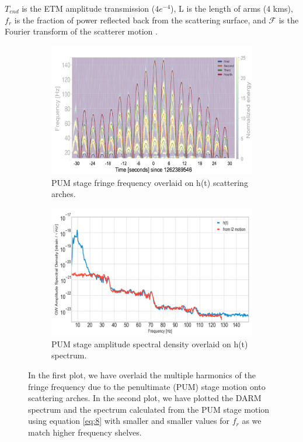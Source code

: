 \documentclass[12pt]{iopart}
\begin{document}
$T_{end}$ is the ETM amplitude transmission ($4e^{-4}$), L is the length of arms ($4$ kms), $f_{r}$ is the fraction of power reflected back from the scattering surface, and $\mathcal{F}$ is the Fourier transform of the scatterer motion \cite{vaj_scat}.
\begin{figure}[h]
\captionsetup[subfigure]{font=scriptsize,labelfont=scriptsize}
   \centering
    \begin{subfigure}[b]{0.45\textwidth}
        \centering
         \includegraphics[width= \textwidth]{fringe_l2c.png}
         \caption{PUM stage fringe frequency overlaid on h(t) scattering arches.}
         \label{fig:fringel2}
    \end{subfigure}
    \hfill
    \begin{subfigure}[b]{0.45\textwidth}
        \centering
         \includegraphics[width =\textwidth]{spectrum_l2new1.png}
         \caption{PUM stage amplitude spectral density overlaid on h(t) spectrum.}
         \label{fig:spectruml2}
         
    
    \end{subfigure}
    \caption{In the first plot, we have overlaid the multiple harmonics of the fringe frequency due to the penultimate (PUM) stage motion onto scattering arches. In the second plot, we have plotted the DARM spectrum and the spectrum calculated from the PUM stage motion using equation \ref{eq:8} with smaller and smaller values for $f_{r}$ as we match higher frequency shelves.}
    \label{fig:fringespectrum}
    
\end{figure}
\end{document}
